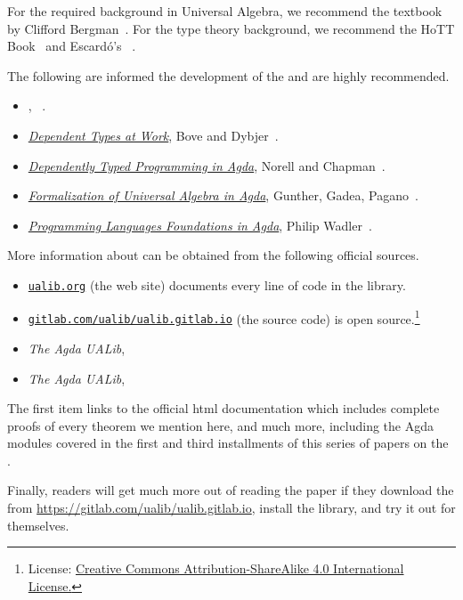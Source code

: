 For the required background in Universal Algebra, we recommend the textbook by Clifford Bergman~\cite{Bergman:2012}.  For the type theory background, we recommend the HoTT Book~\cite{HoTT} and Escard\'o's \ufcourse~\cite{MHE}.

The following are informed the development of the \ualib and are highly recommended.
\begin{itemize}
\item \textit{\ufcourse}, \escardo~\cite{MHE}.
\item \href{http://www.cse.chalmers.se/~peterd/papers/DependentTypesAtWork.pdf}{\it Dependent Types at Work}, Bove and Dybjer~\cite{Bove:2009}.
\item \href{http://www.cse.chalmers.se/~ulfn/papers/afp08/tutorial.pdf}{\it Dependently Typed Programming in Agda}, Norell and Chapman~\cite{Norell:2008}.
\item \href{http://www.sciencedirect.com/science/article/pii/S1571066118300768}{\it Formalization of Universal Algebra in Agda}, Gunther, Gadea, Pagano~\cite{Gunther:2018}.
\item \href{https://plfa.github.io/}{\it Programming Languages Foundations in Agda}, Philip Wadler~\cite{Wadler:2020}.
\end{itemize}

More information about \agdaualib can be obtained from the following official sources.
\begin{itemize}
  \item \href{https://ualib.gitlab.io}{\texttt{ualib.org}} (the web site) documents every line of code in the library.
  \item \href{https://gitlab.com/ualib/ualib.gitlab.io}{\texttt{gitlab.com/ualib/ualib.gitlab.io}} (the source code) \agdaualib is open source.\footnote{License: \href{https://creativecommons.org/licenses/by-sa/4.0/}{Creative Commons Attribution-ShareAlike 4.0 International License.}}
  \item \emph{The Agda UALib}, \otherparta
  \item \emph{The Agda UALib}, \otherpartb
\end{itemize}
The first item links to the official \ualib html documentation which includes complete proofs of every theorem we mention here, and much more, including the Agda modules covered in the first and third installments of this series of papers on the \ualib.

Finally, readers will get much more out of reading the paper if they download the \agdaualib from \url{https://gitlab.com/ualib/ualib.gitlab.io}, install the library, and try it out for themselves.